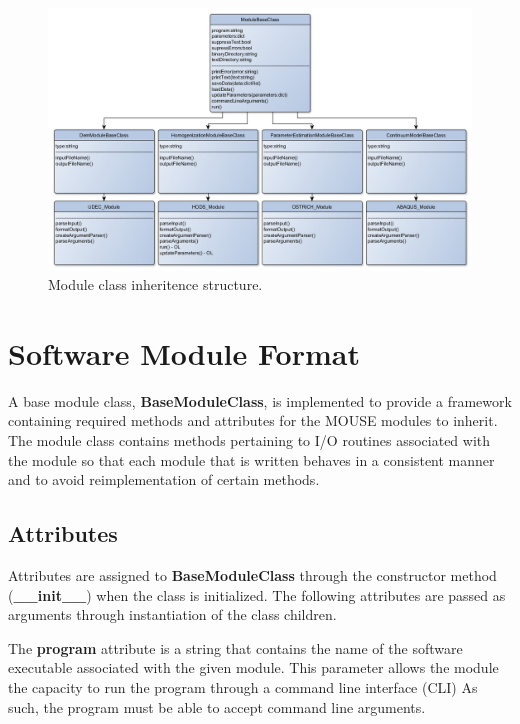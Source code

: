 \begin{figure}[!htb]
\begin{center}
\includegraphics[width=\textwidth]{figures/Chapter4/ModuleClassUML}
\caption{{\label{fig:moduleClass} Module class inheritence structure.%
}}
\end{center}
\end{figure}

\section{Software Module Format}

A base module class, \textbf{BaseModuleClass}, is implemented to provide a framework containing required methods and attributes for the MOUSE modules to inherit. The module class contains methods pertaining to I/O routines associated with the module so that each module that is written behaves in a consistent manner and to avoid reimplementation of certain methods. 

\subsection{Attributes}

Attributes are assigned to \textbf{BaseModuleClass} through the constructor method (\textbf{\_\_init\_\_}) when the class is initialized. The following attributes are passed as arguments through instantiation of the class children. 

The \textbf{program} attribute is a string that contains the name of the software executable associated with the given module. This parameter allows the module the capacity to run the program through a command line interface (CLI) As such, the program must be able to accept command line arguments.

